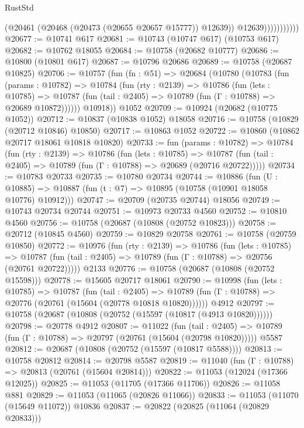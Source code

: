 \begin{lexlean}{RustStd}
\begin{coremodule}
                          (@20461 (@20468 (@20473 (@20655 @20657 @15777)) @12639))
                          @12639)))))))))))
@20677 := @10741 @617
@20681 := @10743 (@10747 @617) (@10753 @617)
@20682 := @10762 @18055
@20684 := @10758 (@20682 @10777)
@20686 := @10800 (@10801 @617)
@20687 := @10796 @20686
@20689 := @10758 (@20687 @10825)
@20706 := @10757
    (fun (fn : @51) =>
    @20684
      (@10780
        (@10783
          (fun (params : @10782) =>
          @10784
            (fun (rty : @2139) =>
            @10786
              (fun (lets : @10785) =>
              @10787 (fun (tail : @2405) => @10789 (fun (Γ : @10788) => @20689 @10872))))))
        @10918))
    @1052
@20709 := @10924 (@20682 (@10775 @1052))
@20712 := @10837 (@10838 @1052) @18058
@20716 := @10758 (@10829 (@20712 @10846) @10850)
@20717 := @10863 @1052
@20722 := @10860 (@10862 @20717 @18061 @10818 @10820)
@20733 := fun (params : @10782) =>
  @10784
    (fun (rty : @2139) =>
    @10786
      (fun (lets : @10785) =>
      @10787 (fun (tail : @2405) => @10789 (fun (Γ : @10788) => @20689 (@20716 @20722)))))
@20734 := @10783 @20733
@20735 := @10780 @20734
@20744 := @10886
    (fun (U : @10885) => @10887 (fun (t : @7) => @10895 (@10758 (@10901 @18058 @10776) @10912)))
@20747 := @20709 (@20735 @20744) @18056
@20749 := @10743 @20734 @20744
@20751 := @10973 @20733 @4560
@20752 := @10810 @4560
@20756 := @10758 (@20687 (@10808 (@20752 @10823)))
@20758 := @20712 (@10845 @4560)
@20759 := @10829 @20758
@20761 := @10758 (@20759 @10850)
@20772 := @10976
    (fun (rty : @2139) =>
    @10786
      (fun (lets : @10785) =>
      @10787 (fun (tail : @2405) => @10789 (fun (Γ : @10788) => @20756 (@20761 @20722)))))
    @2133
@20776 := @10758 (@20687 (@10808 (@20752 @15598)))
@20778 := @15605 @20717 @18061
@20790 := @10998
    (fun (lets : @10785) =>
    @10787
      (fun (tail : @2405) =>
      @10789 (fun (Γ : @10788) => @20776 (@20761 (@15604 (@20778 @10818 @10820))))))
    @4912
@20797 := @10758 (@20687 (@10808 (@20752 (@15597 (@10817 (@4913 @10820))))))
@20798 := @20778 @4912
@20807 := @11022
    (fun (tail : @2405) => @10789 (fun (Γ : @10788) => @20797 (@20761 (@15604 (@20798 @10820)))))
    @5587
@20812 := @20687 (@10808 (@20752 (@15597 (@10817 @5588))))
@20813 := @10758 @20812
@20814 := @20798 @5587
@20819 := @11040 (fun (Γ : @10788) => @20813 (@20761 (@15604 @20814)))
@20822 := @11053 (@12024 (@17366 @12025))
@20825 := @11053 (@11705 (@17366 @11706))
@20826 := @11058 @881
@20829 := @11053 (@11065 (@20826 @11066))
@20833 := @11053 (@11070 (@15649 @11072)) @10836
@20837 := @20822 (@20825 (@11064 (@20829 @20833)))

\end{coremodule}
\end{lexlean}
